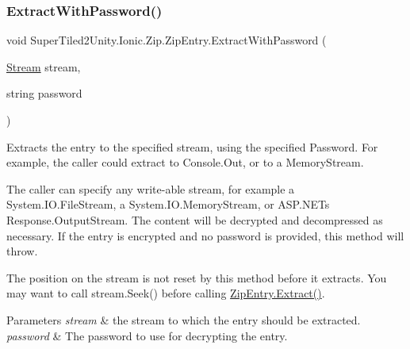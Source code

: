 \subsubsection{\texorpdfstring{Extract\+With\+Password()}{ExtractWithPassword()}\hspace{0.1cm}{\footnotesize\ttfamily [5/5]}}
{\footnotesize\ttfamily void Super\+Tiled2\+Unity.\+Ionic.\+Zip.\+Zip\+Entry.\+Extract\+With\+Password (\begin{DoxyParamCaption}\item[{\mbox{\hyperlink{namespace_super_tiled2_unity_1_1_ionic_1_1_zip_a9ced5352c56e7e0fceff15b534073c83aeae835e83c0494a376229f254f7d3392}{Stream}}}]{stream,  }\item[{string}]{password }\end{DoxyParamCaption})}



Extracts the entry to the specified stream, using the specified Password. For example, the caller could extract to Console.\+Out, or to a Memory\+Stream. 

The caller can specify any write-\/able stream, for example a System.\+I\+O.\+File\+Stream, a System.\+I\+O.\+Memory\+Stream, or A\+S\+P.\+N\+ET\textquotesingle{}s {\ttfamily Response.\+Output\+Stream}. The content will be decrypted and decompressed as necessary. If the entry is encrypted and no password is provided, this method will throw. 

The position on the stream is not reset by this method before it extracts. You may want to call stream.\+Seek() before calling \mbox{\hyperlink{class_super_tiled2_unity_1_1_ionic_1_1_zip_1_1_zip_entry_a9d65543aadd23e47e188175412891b42}{Zip\+Entry.\+Extract()}}. 


\begin{DoxyParams}{Parameters}
{\em stream} & the stream to which the entry should be extracted. \\
\hline
{\em password} & The password to use for decrypting the entry. \\
\hline
\end{DoxyParams}
\mbox{\label{class_super_tiled2_unity_1_1_ionic_1_1_zip_1_1_zip_entry_a825692bb86f2c5da7eefc1e9714ae18c}} 

